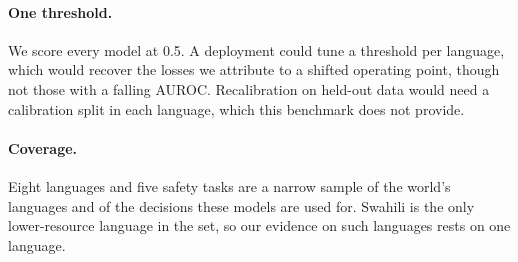 \paragraph{One threshold.} We score every model at 0.5. A deployment could tune
a threshold per language, which would recover the losses we attribute to a
shifted operating point, though not those with a falling AUROC. Recalibration
on held-out data \citep{guo2017calibration} would need a calibration split in
each language, which this benchmark does not provide.

\paragraph{Coverage.} Eight languages and five safety tasks are a narrow sample of
the world's languages and of the decisions these models are used for. Swahili is
the only lower-resource language in the set, so our evidence on such languages
rests on one language.
